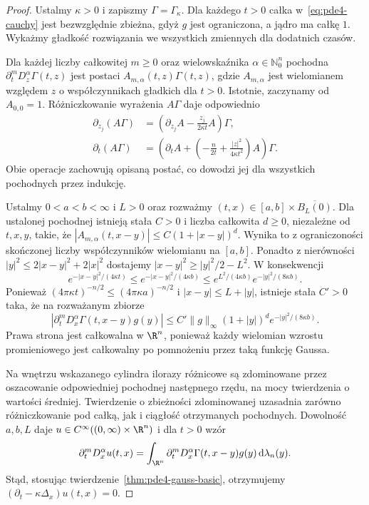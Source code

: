 \begin{proof}
Ustalmy $\kappa>0$ i zapiszmy $\Gamma=\Gamma_\kappa$.
Dla każdego $t>0$ całka w~\eqref{eq:pde4-cauchy}
jest bezwzględnie zbieżna, gdyż $g$ jest ograniczona,
a jądro ma całkę $1$. Wykażmy gładkość rozwiązania
we wszystkich zmiennych dla dodatnich czasów.

Dla każdej liczby całkowitej $m\geq0$ oraz
wielowskaźnika $\alpha\in\mathbb N_0^n$ pochodna
$\partial_t^mD_z^\alpha\Gamma(t,z)$ jest postaci
$A_{m,\alpha}(t,z)\Gamma(t,z)$, gdzie $A_{m,\alpha}$
jest wielomianem względem $z$ o współczynnikach
gładkich dla $t>0$. Istotnie, zaczynamy od $A_{0,0}=1$.
Różniczkowanie wyrażenia $A\Gamma$ daje odpowiednio
\[
 \begin{aligned}
 \partial_{z_j}(A\Gamma)
 &=\left(\partial_{z_j}A-\frac{z_j}{2\kappa t}A\right)\Gamma,\\
 \partial_t(A\Gamma)
 &=\left(\partial_tA+
 \left(-\frac n{2t}+\frac{|z|^2}{4\kappa t^2}\right)A\right)\Gamma.
 \end{aligned}
\]
Obie operacje zachowują opisaną postać, co dowodzi
jej dla wszystkich pochodnych przez indukcję.

Ustalmy $0<a<b<\infty$ i $L>0$ oraz rozważmy
$(t,x)\in[a,b]\times\overline{B_L(0)}$.
Dla ustalonej pochodnej istnieją stała $C>0$
i liczba całkowita $d\geq0$, niezależne od $t,x,y$,
takie, że $|A_{m,\alpha}(t,x-y)|\leq C(1+|x-y|)^d$.
Wynika to z ograniczoności skończonej liczby
współczynników wielomianu na $[a,b]$.
Ponadto z nierówności
$|y|^2\leq2|x-y|^2+2|x|^2$ dostajemy
$|x-y|^2\geq |y|^2/2-L^2$. W konsekwencji
\[
 e^{-|x-y|^2/(4\kappa t)}
 \leq e^{-|x-y|^2/(4\kappa b)}
 \leq e^{L^2/(4\kappa b)}e^{-|y|^2/(8\kappa b)}.
\]
Ponieważ $(4\pi\kappa t)^{-n/2}\leq(4\pi\kappa a)^{-n/2}$
i $|x-y|\leq L+|y|$, istnieje stała $C'>0$ taka,
że na rozważanym zbiorze
\[
 |\partial_t^mD_x^\alpha\Gamma(t,x-y)g(y)|
 \leq C'\|g\|_\infty(1+|y|)^d
       e^{-|y|^2/(8\kappa b)}.
\]
Prawa strona jest całkowalna w $\R^n$, ponieważ
każdy wielomian wzrostu promieniowego jest
całkowalny po pomnożeniu przez taką funkcję Gaussa.

Na wnętrzu wskazanego cylindra ilorazy różnicowe
są zdominowane przez oszacowanie odpowiedniej
pochodnej następnego rzędu, na mocy twierdzenia
o wartości średniej. Twierdzenie o zbieżności
zdominowanej uzasadnia zarówno różniczkowanie
pod całką, jak i ciągłość otrzymanych pochodnych.
Dowolność $a,b,L$ daje $u\in C^\infty((0,\infty)\times\R^n)$
i dla $t>0$ wzór
\[
 \partial_t^mD_x^\alpha u(t,x)
 =\int_{\R^n}\partial_t^mD_x^\alpha\Gamma(t,x-y)
 g(y)\,\mathrm d\lambda_n(y).
\]
Stąd, stosując twierdzenie~\ref{thm:pde4-gauss-basic},
otrzymujemy
$(\partial_t-\kappa\Delta_x)u(t,x)=0$.


\end{proof}
